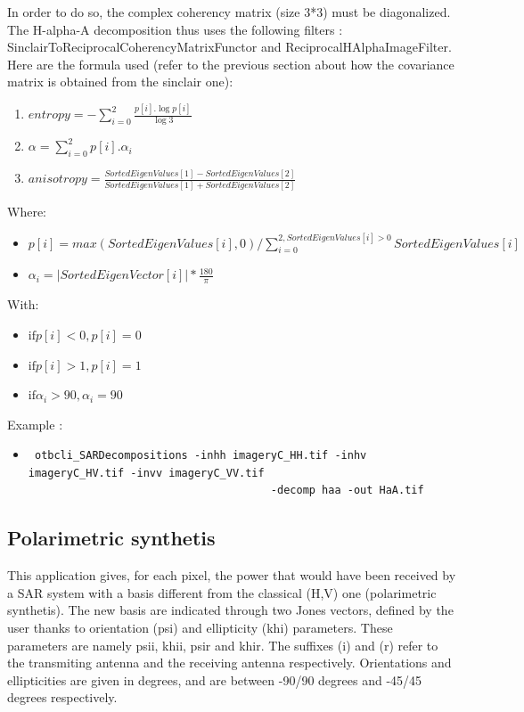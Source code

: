 In order to do so, the complex coherency matrix (size 3*3) must be diagonalized.
The H-alpha-A decomposition thus uses the following filters : SinclairToReciprocalCoherencyMatrixFunctor and ReciprocalHAlphaImageFilter.
Here are the formula used (refer to the previous section about how the covariance matrix is obtained from the sinclair one):
\begin{enumerate}
\renewcommand{\labelenumi}{Channel \arabic{enumi} : }
\item $ entropy = -\sum_{i=0}^{2} \frac{p[i].\log{p[i]}}{\log{3}} $
\item $ \alpha = \sum_{i=0}^{2} p[i].\alpha_{i} $
\item $ anisotropy = \frac {SortedEigenValues[1] - SortedEigenValues[2]}{SortedEigenValues[1] + SortedEigenValues[2]} $
\end{enumerate}

Where:
\begin{itemize}
\item $ p[i] = max(SortedEigenValues[i], 0) / \sum_{i=0}^{2, SortedEigenValues[i]>0} SortedEigenValues[i] $
\item $ \alpha_{i} = \left| SortedEigenVector[i] \right|* \frac{180}{\pi}$
\end{itemize}

With:
\begin{itemize}
\item $ \text{if} p[i] < 0, p[i]=0 $
\item $ \text{if} p[i] > 1, p[i]=1 $
\item $ \text{if} \alpha_{i} > 90, \alpha_{i}=90 $
\end{itemize}

Example :

\begin{itemize}
\item \begin{verbatim} otbcli_SARDecompositions -inhh imageryC_HH.tif -inhv imageryC_HV.tif -invv imageryC_VV.tif 
									  -decomp haa -out HaA.tif \end{verbatim}
\end{itemize}

\subsection{Polarimetric synthetis}\label{ssec:polsynth}

This application gives, for each pixel, the power that would have been received by a SAR system with a basis different from the classical (H,V) one (polarimetric synthetis). 
The new basis are indicated through two Jones vectors, defined by the user thanks to orientation (psi) and ellipticity (khi) parameters.
These parameters are namely psii, khii, psir and khir. The suffixes (i) and (r) refer to the transmiting antenna and the receiving antenna respectively.
Orientations and ellipticities are given in degrees, and are between -90/90 degrees and -45/45 degrees respectively. 

